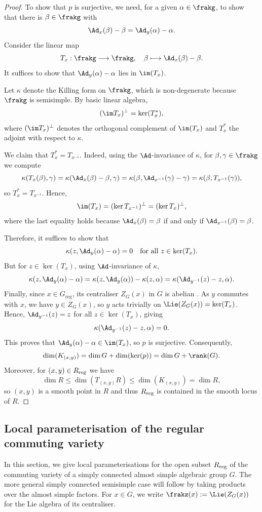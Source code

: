 \documentclass[12pt, a4paper, oneside]{amsart}
\theoremstyle{plain} %
\theoremstyle{definition} %
\theoremstyle{remark} %
\begin{document}
 \begin{proof}
To show that $p$ is surjective, we need, for a given $\alpha\in \frakg$, to show that there is $\beta\in \frakg$ with
\[\Ad_x(\beta) - \beta = \Ad_y(\alpha) - \alpha.\]
Consider the linear map
\[T_x:\frakg \longrightarrow \frakg, \quad \beta \longmapsto \Ad_x(\beta) - \beta.\]  
It suffices to show that $\Ad_y(\alpha) - \alpha$ lies in $\im(T_x)$.

Let $\kappa$ denote the Killing form on $\frakg$, which is non-degenerate because $\frakg$ is semisimple. By basic linear algebra,
\[(\im T_x)^\perp = \ker(T_x^*),\]  
where $(\im T_x)^\perp$ denotes the orthogonal complement of $\im(T_x)$ and $T_x^*$ the adjoint with respect to $\kappa$.

We claim that $T_x^* = T_{x^{-1}}$. Indeed, using the $\Ad$-invariance of $\kappa$, for $\beta,\gamma\in \frakg$ we compute
\[\kappa(T_x(\beta), \gamma) = \kappa(\Ad_x(\beta) - \beta, \gamma) = \kappa(\beta, \Ad_{x^{-1}}(\gamma) - \gamma) = \kappa(\beta, T_{x^{-1}}(\gamma)),\]
so $T_x^* = T_{x^{-1}}$. Hence,
\[\im(T_x) = (\ker T_{x^{-1}})^\perp = (\ker T_x)^\perp,\]
where the last equality holds because $\Ad_x(\beta) = \beta$ if and only if $\Ad_{x^{-1}}(\beta) = \beta$.

Therefore, it suffices to show that
\[\kappa(z, \Ad_y(\alpha) - \alpha) = 0 \quad \text{for all } z\in \ker(T_x).\]  
But for $z\in \ker(T_x)$, using $\Ad$-invariance of $\kappa$,
\[\kappa(z, \Ad_y(\alpha) - \alpha) = \kappa(z, \Ad_y(\alpha)) - \kappa(z, \alpha) = \kappa(\Ad_{y^{-1}}(z) - z, \alpha).\]
Finally, since $x\in G_{\mathrm{reg}}$, its centraliser $Z_G(x)$ in $G$ is abelian \cite[Theorem~D]{Kur78}. As $y$ commutes with $x$, we have $y\in Z_G(x)$, so $y$ acts trivially on $\Lie(Z_G(x)) = \ker(T_x)$. Hence, $\Ad_{y^{-1}}(z) = z$ for all $z\in \ker(T_x)$, giving
\[\kappa(\Ad_{y^{-1}}(z) - z, \alpha) = 0.\]  
This proves that $\Ad_y(\alpha) - \alpha \in \im(T_x)$, so $p$ is surjective. Consequently, 
\[\dim (K_{(x,y)}) = \dim G + \dim(\ker(p)) = \dim G +\rank(G).\]
Moreover, for $(x,y)\in R_{\rm reg}$ we have
\[\dim R\leq \dim(T_{(x,y)}R)\leq \dim(K_{(x,y)})=\dim R,\]
 so $(x,y)$ is a smooth point in $R$ and thus $R_{\rm reg}$ is contained in the smooth locus of $R$.
\end{proof}
 

\subsection{Local parameterisation of the regular commuting variety}\label{c:localparams}
In this section, we give local parameterisations for the open subset $R_{\rm reg}$ of the commuting variety of a simply connected almost simple algebraic group $G$. The more general simply connected semisimple case will follow by taking products over the almost simple factors. For $x\in G$, we write $\frakz(x):=\Lie(Z_G(x))$ for the Lie algebra of its centraliser.
\end{document}
